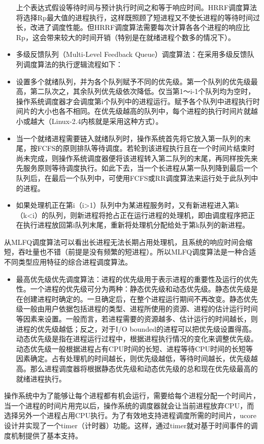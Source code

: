 \begin{itemize}
  上个表达式假设等待时间与预计执行时间之和等于响应时间。HRRF调度算法将选择Rp最大值的进程执行，这样既照顾了短进程又不使长进程的等待时间过长，改进了调度性能。但HRRF调度算法需要每次计算各各个进程的响应比Rp，这会带来较大的时间开销（特别是在就绪进程个数多的情况下）。
\item
  多级反馈队列（Multi-Level Feedback
  Queue）调度算法：在采用多级反馈队列调度算法的执行逻辑流程如下：
\item
  设置多个就绪队列，并为各个队列赋予不同的优先级。第一个队列的优先级最高，第二队次之，其余队列优先级依次降低。仅当第1～i-1个队列均为空时，操作系统调度器才会调度第i个队列中的进程运行。赋予各个队列中进程执行时间片的大小也各不相同。在优先级越高的队列中，每个进程的执行时间片就越小或越大（Linux-2.4内核就是采用这种方式）。
\item
  当一个就绪进程需要链入就绪队列时，操作系统首先将它放入第一队列的末尾，按FCFS的原则排队等待调度。若轮到该进程执行且在一个时间片结束时尚未完成，则操作系统调度器便将该进程转入第二队列的末尾，再同样按先来先服务原则等待调度执行。如此下去，当一个长进程从第一队列降到最后一个队列后，在最后一个队列中，可使用FCFS或RR调度算法来运行处于此队列中的进程。
\item
  如果处理机正在第i（i\textgreater{}1）队列中为某进程服务时，又有新进程进入第k（k\textless{}i）的队列，则新进程将抢占正在运行进程的处理机，即由调度程序把正在执行进程放回第i队列末尾，重新将处理机分配给处于第k队列的新进程。
\end{itemize}

从MLFQ调度算法可以看出长进程无法长期占用处理机，且系统的响应时间会缩短，吞吐量也不错（前提是没有频繁的短进程）。所以MLFQ调度算法是一种合适不同类型应用特征的综合进程调度算法。

\begin{itemize}
\item
  最高优先级优先调度算法：进程的优先级用于表示进程的重要性及运行的优先性。一个进程的优先级可分为两种：静态优先级和动态优先级。静态优先级是在创建进程时确定的。一旦确定后，在整个进程运行期间不再改变。静态优先级一般由用户依据包括进程的类型、进程所使用的资源、进程的估计运行时间等因素来设置。一般而言，若进程需要的资源越多、估计运行的时间越长，则进程的优先级越低；反之，对于I/O
  bounded的进程可以把优先级设置得高。动态优先级是指在进程运行过程中，根据进程执行情况的变化来调整优先级。动态优先级一般根据进程占有CPU时间的长短、进程等待CPU时间的长短等因素确定。占有处理机的时间越长，则优先级越低，等待时间越长，优先级越高。那么进程调度器将根据静态优先级和动态优先级的总和现在优先级最高的就绪进程执行。
\end{itemize}

操作系统中为了能够让每个进程都有机会运行，需要给每个进程分配一个时间片，当一个进程的时间片用完以后，操作系统的调度器就会让当前进程放弃CPU，而选择另外一个进程占用CPU执行。为了有效地支持进程调度所需的时间片，ucore设计并实现了一个timer（计时器）功能。这样，通过timer就对基于时间事件的调度机制提供了基本支持。
